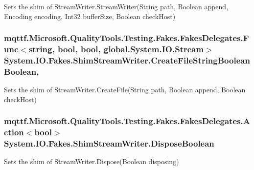 Sets the shim of Stream\-Writer.\-Stream\-Writer(\-String path, Boolean append, Encoding encoding, Int32 buffer\-Size, Boolean check\-Host)

\hypertarget{class_system_1_1_i_o_1_1_fakes_1_1_shim_stream_writer_a70a96a8b1a4fbcaaea5199f25b2405dc}{
\subsubsection[{Create\-File\-String\-Boolean\-Boolean}]{\setlength{\rightskip}{0pt plus 5cm}mqttf.\-Microsoft.\-Quality\-Tools.\-Testing.\-Fakes.\-Fakes\-Delegates.\-Func$<$string, bool, bool, global.\-System.\-I\-O.\-Stream$>$ System.\-I\-O.\-Fakes.\-Shim\-Stream\-Writer.\-Create\-File\-String\-Boolean\-Boolean\hspace{0.3cm}{\ttfamily [static]}, {\ttfamily [set]}}}\label{class_system_1_1_i_o_1_1_fakes_1_1_shim_stream_writer_a70a96a8b1a4fbcaaea5199f25b2405dc}


Sets the shim of Stream\-Writer.\-Create\-File(\-String path, Boolean append, Boolean check\-Host)

\hypertarget{class_system_1_1_i_o_1_1_fakes_1_1_shim_stream_writer_a52f99778971b866cc433091f68b93259}{
\subsubsection[{Dispose\-Boolean}]{\setlength{\rightskip}{0pt plus 5cm}mqttf.\-Microsoft.\-Quality\-Tools.\-Testing.\-Fakes.\-Fakes\-Delegates.\-Action$<$bool$>$ System.\-I\-O.\-Fakes.\-Shim\-Stream\-Writer.\-Dispose\-Boolean\hspace{0.3cm}{\ttfamily [set]}}}\label{class_system_1_1_i_o_1_1_fakes_1_1_shim_stream_writer_a52f99778971b866cc433091f68b93259}


Sets the shim of Stream\-Writer.\-Dispose(\-Boolean disposing)

